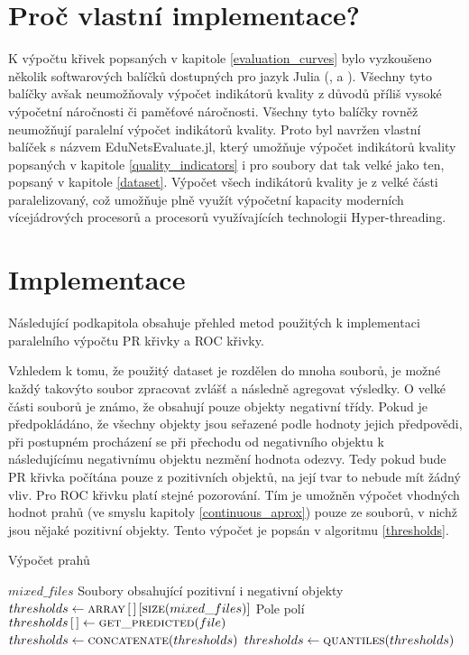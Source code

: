 \section{Proč vlastní implementace?}
K výpočtu křivek popsaných v kapitole \ref{evaluation_curves} bylo vyzkoušeno několik softwarových balíčků dostupných pro jazyk Julia (\cite{zea_roc.jl:_2015}, \cite{leeuwen_rocanalysis.jl:_2016} a \cite{lin_mlbase.jl:_2017}). Všechny tyto balíčky avšak neumožňovaly výpočet indikátorů kvality z důvodů příliš vysoké výpočetní náročnosti či paměťové náročnosti. Všechny tyto balíčky rovněž neumožňují paralelní výpočet indikátorů kvality. Proto byl navržen vlastní balíček s názvem EduNetsEvaluate.jl, který umožňuje výpočet indikátorů kvality popsaných v kapitole \ref{quality_indicators} i pro soubory dat tak velké jako ten, popsaný v kapitole \ref{dataset}. Výpočet všech indikátorů kvality je z velké části paralelizovaný, což umožňuje plně využít výpočetní kapacity moderních vícejádrových procesorů a procesorů využívajících technologii Hyper-threading.

\section{Implementace}
Následující podkapitola obsahuje přehled metod použitých k implementaci paralelního výpočtu PR křivky a ROC křivky.

Vzhledem k tomu, že použitý dataset je rozdělen do mnoha souborů, je možné každý takovýto soubor zpracovat zvlášť a následně agregovat výsledky. O velké části souborů je známo, že obsahují pouze objekty negativní třídy. Pokud je předpokládáno, že všechny objekty jsou seřazené podle hodnoty jejich předpovědi, při postupném procházení se při přechodu od negativního objektu k následujícímu negativnímu objektu nezmění hodnota odezvy. Tedy pokud bude PR křivka počítána pouze z pozitivních objektů, na její tvar to nebude mít žádný vliv. Pro ROC křivku platí stejné pozorování. Tím je umožněn výpočet vhodných hodnot prahů (ve smyslu kapitoly \ref{continuous_aprox}) pouze ze souborů, v nichž jsou nějaké pozitivní objekty. Tento výpočet je popsán v algoritmu \ref{thresholds}.

\begin{algorithm}
	\caption{Výpočet prahů}
	\label{thresholds}
	\begin{algorithmic}
		\Require $ mixed\_files $ \Comment Soubory obsahující pozitivní i negativní objekty
		\Statex
		\State $ thresholds \gets \Call{array}{} \left[ \, \right] \left[ \Call{size}{mixed\_files} \right] $ \Comment Pole polí
			\State $ thresholds \left[ \, \right] \gets \Call{get\_predicted}{file} $
		\EndFor
		\State $ thresholds \gets \Call{concatenate}{thresholds} $
		\State $ thresholds \gets \Call{quantiles}{thresholds} $
	\end{algorithmic}
\end{algorithm}

